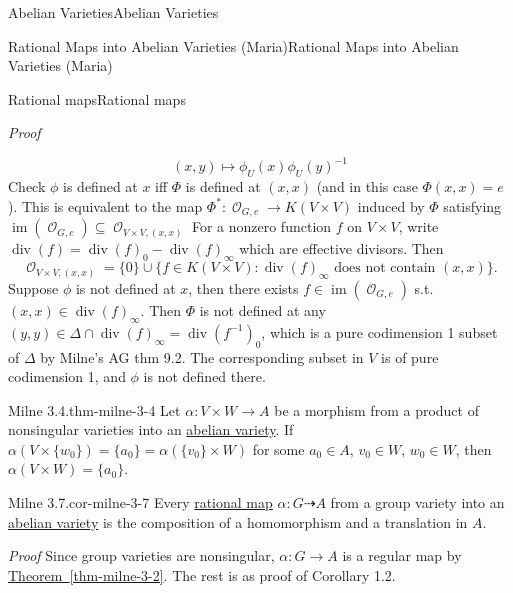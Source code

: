 \documentclass[10pt,]{book}
\makeatletter
\renewcommand*{\proofname}{Proof}
\renewenvironment{proof}[1][\proofname]{\par
  \pushQED{\qed}%
  \normalfont \topsep6\p@\@plus6\p@\relax
  \trivlist
  \item\relax
    {\itshape
    #1\@addpunct{.}}\hspace\labelsep\ignorespaces
}{%
  \popQED\endtrivlist\@endpefalse
}
\numberwithin{equation}{section}
\newcommand{\sheaf}[1]{\operatorname{\mathcal{#1}}}
\DeclareMathOperator{\divisor}{div}
\DeclareMathOperator{\im}{im}
\makeatother
\begin{document}
\begin{chapterptx}{Abelian Varieties}{}{Abelian Varieties}{}{}
\begin{sectionptx}{Rational Maps into Abelian Varieties (Maria)}{}{Rational Maps into Abelian Varieties (Maria)}{}{}
\begin{subsectionptx}{Rational maps}{}{Rational maps}{}{}
\begin{proof}
\begin{equation*}
\end{equation*}
%
\begin{equation*}
(x,y) \mapsto \phi_U(x) \phi_U(y)^{-1}
\end{equation*}
Check \(\phi\) is defined at \(x\) iff \(\Phi\) is defined at \((x,x)\) (and in this case \(\Phi(x,x) = e\)). This is equivalent to the map \(\Phi^*\colon \sheaf O_{G,e} \to K(V\times V)\) induced by  \(\Phi\) satisfying   \(\im(\sheaf O_{G,e}) \subseteq \sheaf O_{V\times V, (x,x)}\) For a nonzero function \(f\) on \(V\times V\), write \(\divisor(f) = \divisor(f)_0 - \divisor(f)_\infty\) which are effective divisors. Then%
\begin{equation*}
\sheaf O_{V\times V, (x,x)} = \{0\} \cup \{f\in K(V\times V) : \divisor(f)_\infty \text{ does not contain }(x,x)\}\text{.}
\end{equation*}
Suppose \(\phi\) is not defined at \(x\), then there exists \(f\in \im(\sheaf O_{G,e})\) s.t. \((x,x) \in \divisor(f)_\infty\). Then \(\Phi\) is not defined at any \((y,y) \in \Delta \cap  \divisor(f)_\infty = \divisor(f^{-1})_0\), which is a pure codimension 1 subset of \(\Delta\) by Milne's AG thm 9.2. The corresponding subset in \(V\) is of pure codimension 1, and \(\phi\) is not defined there.%
\end{proof}
\begin{theorem}{Milne 3.4.}{}{thm-milne-3-4}%
\hypertarget{p-93}{}%
Let \(\alpha \colon V \times W \to A\) be a morphism from a product of nonsingular varieties into an \hyperref[def-buntes-abvar]{abelian variety}. If \(\alpha (V\times\{w_0\}) = \{a_0 \} =  \alpha(\{v_0 \}\times W)\) for some \(a_0 \in A\), \(v_0\in W\), \(w_0 \in W\), then \(\alpha(V\times W) = \{a_0\}\).%
\end{theorem}
\begin{corollary}{Milne 3.7.}{}{cor-milne-3-7}%
\hypertarget{p-94}{}%
Every \hyperref[def-rational-map]{rational map} \(\alpha \colon G\dashrightarrow A\) from a group variety into an \hyperref[def-buntes-abvar]{abelian variety} is the composition of a homomorphism and a translation in \(A\).%
\end{corollary}
\begin{proof}\hypertarget{proof-15}{}
\hypertarget{p-95}{}%
Since group varieties are nonsingular, \(\alpha\colon G \to A\) is a regular map by \hyperref[thm-milne-3-2]{Theorem~\ref{thm-milne-3-2}}. The rest is as proof of Corollary 1.2.%
\end{proof}
\end{subsectionptx}
%
%
\typeout{************************************************}

\end{sectionptx}
\end{chapterptx}
\end{document}
